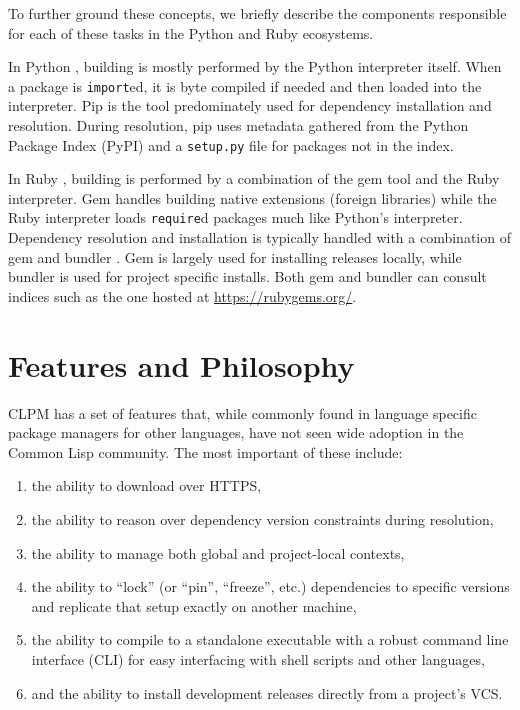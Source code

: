 \documentclass[format=sigconf]{acmart}
\begin{document}
To further ground these concepts, we briefly describe the components
responsible for each of these tasks in the Python and Ruby ecosystems.

In Python \cite{python}, building is mostly performed by the Python interpreter
itself. When a package is \verb|import|ed, it is byte compiled if needed and
then loaded into the interpreter. Pip \cite{pip} is the tool predominately used
for dependency installation and resolution. During resolution, pip uses
metadata gathered from the Python Package Index (PyPI) \cite{pypi} and a
\verb|setup.py| file for packages not in the index.

In Ruby \cite{ruby}, building is performed by a combination of the gem tool
\cite{gem} and the Ruby interpreter. Gem handles building native extensions
(foreign libraries) while the Ruby interpreter loads \verb|require|d packages
much like Python's interpreter. Dependency resolution and installation is
typically handled with a combination of gem and bundler \cite{bundler}. Gem is
largely used for installing releases locally, while bundler is used for project
specific installs. Both gem and bundler can consult indices such as the one
hosted at \url{https://rubygems.org/}.

\section{Features and Philosophy}

CLPM has a set of features that, while commonly found in language specific
package managers for other languages, have not seen wide adoption in the Common
Lisp community. The most important of these include:

\begin{enumerate}
\item the ability to download over HTTPS,
\item the ability to reason over dependency version constraints during
  resolution,
\item the ability to manage both global and project-local contexts,
\item the ability to ``lock'' (or ``pin'', ``freeze'', etc.) dependencies to
  specific versions and replicate that setup exactly on another machine,
\item the ability to compile to a standalone executable with a robust command
  line interface (CLI) for easy interfacing with shell scripts and other
  languages,
\item and the ability to install development releases directly from a project's
  VCS.
\end{enumerate}
\end{document}
